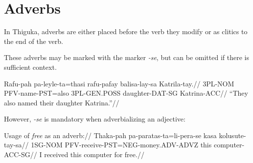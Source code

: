 \section{Adverbs}
In Thiguka, adverbs are either placed before the verb they modify or as clitics to the end of the verb.

These adverbs may be marked with the marker \textit{-se}, but can be omitted if there is sufficient context.

\ex
\begingl
\gla   Rafu-pah pa-leyle-ta=thasi rafu-pafay   balisa-lay-sa   Katrila-tay.//
\glb   3PL-NOM  PFV-name-PST=also 3PL-GEN.POSS daughter-DAT-SG Katrina-ACC//
\glft  ``They also named their daughter Katrina.''//
\endgl
\xe


However, \textit{-se} is mandatory when adverbializing an adjective:

\ex
\begingl
\glpreamble Usage of \textit{free} as an adverb:// 
\gla   Thaka-pah pa-paratas-ta=li-pera-se           kasa kolusute-tay-sa//
\glb   1SG-NOM   PFV-receive-PST=NEG-money.ADV-ADVZ this computer-ACC-SG//
\glft  I received this computer for free.//
\endgl
\xe
